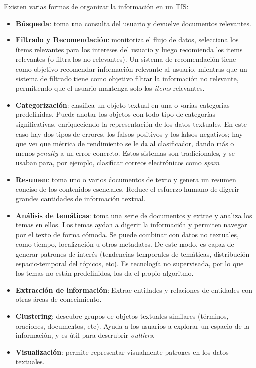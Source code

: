 \noindent Existen varias formas de organizar la información en un TIS:

\begin{itemize}
    \item \textbf{Búsqueda}: toma una consulta del usuario y devuelve documentos relevantes.
    \item \textbf{Filtrado y Recomendación}: monitoriza el flujo de datos, selecciona los ítems relevantes para los intereses del usuario y luego recomienda los items relevantes (o filtra los no relevantes). Un sistema de recomendación tiene como objetivo recomendar información relevante al usuario, mientras que un sistema de filtrado tiene como objetivo filtrar la información no relevante, permitiendo que el usuario mantenga solo los \textit{items} relevantes.
    \item \textbf{Categorización}: clasifica un objeto textual en una o varias categorías predefinidas. Puede anotar los objetos con todo tipo de categorías significativas, enriqueciendo la representación de los datos textuales. En este caso hay dos tipos de errores, los falsos positivos y los falsos negativos; hay que ver que métrica de rendimiento se le da al clasificador, dando más o menos \textit{penalty} a un error concreto. Estos sistemas son tradicionales, y se usaban para, por ejemplo, clasificar correos electrónicos como \textit{spam}.
    \item \textbf{Resumen}: toma uno o varios documentos de texto y genera un resumen conciso de los contenidos esenciales. Reduce el esfuerzo humano de digerir grandes cantidades de información textual.
    \item \textbf{Análisis de temáticas}: toma una serie de documentos y extrae y analiza los temas en ellos. Los temas aydan a digerir la información y permiten navegar por el texto de forma cómoda. Se puede combinar con datos no textuales, como tiempo, localización u otros metadatos. De este modo, es capaz de generar patrones de interés (tendencias temporales de temáticas, distribución espacio-temporal del tópicos, etc). Es tecnología no supervisada, por lo que los temas no están predefinidos, los da el propio algoritmo.
    \item \textbf{Extracción de información}: Extrae entidades y relaciones de entidades con otras áreas de conocimiento. 
    \item \textbf{Clustering}: descubre grupos de objetos textuales similares (términos, oraciones, documentos, etc). Ayuda a los usuarios a explorar un espacio de la información, y es útil para descrubrir \textit{outliers}. 
    \item \textbf{Visualización}: permite representar visualmente patrones en los datos textuales.
\end{itemize}